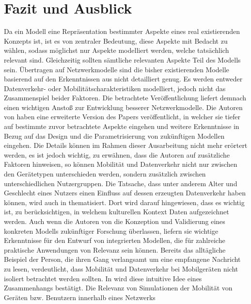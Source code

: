 \documentclass[12pt, a4paper]{article}
\begin{document}
\vfill
\pagebreak

\section{Fazit und Ausblick}
\label{sec:conclusion}

Da ein Modell eine Repräsentation bestimmter Aspekte eines real existierenden Konzepts ist,
ist es von zentraler Bedeutung, diese Aspekte mit Bedacht zu wählen, sodass möglichst nur
Aspekte modelliert werden, welche tatsächlich relevant sind. Gleichzeitig sollten sämtliche relevanten
Aspekte Teil des Modells sein. Übertragen auf Netzwerkmodelle sind die bisher existierenden Modelle
basierend auf den Erkenntnissen aus \cite{Alipour2018} nicht detailliert genug. Es werden entweder
Datenverkehr- oder Mobilitätscharakteristiken modelliert, jedoch nicht das Zusammenspiel beider Faktoren.
Die betrachtete Veröffentlichung liefert demnach einen wichtigen Anstoß zur Entwicklung besserer Netzwerkmodelle.
Die Autoren von \cite{Alipour2018} haben eine erweiterte Version des Papers veröffentlicht,
in welcher sie tiefer auf bestimmte zuvor betrachtete Aspekte eingehen und weitere Erkenntnisse in Bezug
auf das Design und die Parametrisierung von zukünftigen Modellen eingehen.
Die Details können im Rahmen dieser Ausarbeitung nicht mehr erörtert werden, es ist jedoch wichtig, zu erwähnen,
dass die Autoren auf zusätzliche Faktoren hinweisen, so können Mobilität und Datenverkehr nicht nur
zwischen den Gerätetypen unterschieden werden, sondern zusätzlich zwischen unterschiedlichen Nutzergruppen.
Die Tatsache, dass unter anderem Alter und Geschlecht eines Nutzers einen Einfluss auf dessen erzeugten Datenverkehr haben können,
wird auch in \cite{Oliveira2014} thematisiert. Dort wird darauf hingewiesen, dass es wichtig ist,
zu berücksichtigen, in welchem kulturellen Kontext Daten aufgezeichnet werden.\newline
Auch wenn die Autoren von \cite{Alipour2018} die Konzeption und Validierung eines konkreten Modells
zukünftiger Forschung überlassen, liefern sie wichtige Erkenntnisse für den Entwurf von integrierten Modellen,
die für zahlreiche praktische Anwendungen von Relevanz sein können.
Bereits das alltägliche Beispiel der Person, die ihren Gang verlangsamt um eine empfangene Nachricht zu lesen,
verdeutlicht, dass Mobilität und Datenverkehr bei Mobilgeräten nicht isoliert betrachtet werden sollten.
In \cite{Alipour2018} wird diese intuitive Idee eines Zusammenhangs bestätigt.\newline
Die Relevanz von Simulationen der Mobilität von Geräten bzw. Benutzern innerhalb eines Netzwerks
\end{document}
